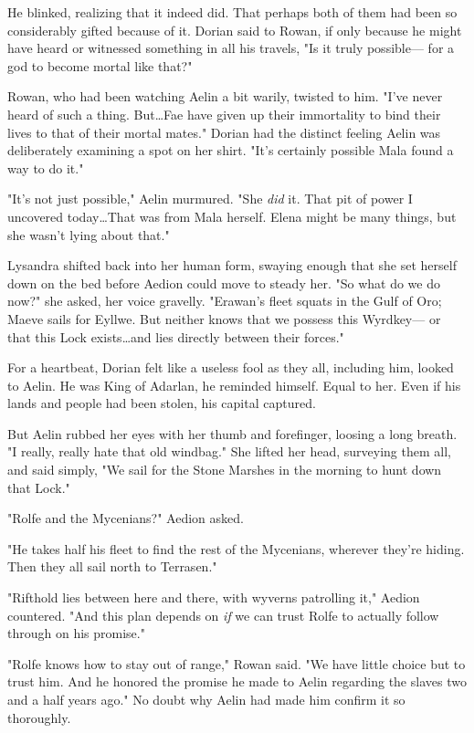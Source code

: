 He blinked, realizing that it indeed did.
That perhaps both of them had been so considerably gifted because of it.
Dorian said to Rowan, if only because he might have heard or witnessed something in all his travels, "Is it truly possible--- for a god to become mortal like that?"

Rowan, who had been watching Aelin a bit warily, twisted to him.
"I've never heard of such a thing.
But\ldots Fae have given up their immortality to bind their lives to that of their mortal mates."
Dorian had the distinct feeling Aelin was deliberately examining a spot on her shirt.
"It's certainly possible Mala found a way to do it."

"It's not just possible," Aelin murmured.
"She \emph{did} it.
That  pit of power I uncovered today\ldots That was from Mala herself.
Elena might be many things, but she wasn't lying about that."

Lysandra shifted back into her human form, swaying enough that she set herself down on the bed before Aedion could move to steady her.
"So what do we do now?"
she asked, her voice gravelly.
"Erawan's fleet squats in the Gulf of Oro; Maeve sails for Eyllwe.
But neither knows that we possess this Wyrdkey--- or that this Lock exists\ldots and lies directly between their forces."

For a heartbeat, Dorian felt like a useless fool as they all, including him, looked to Aelin.
He was King of Adarlan, he reminded himself.
Equal to her.
Even if his lands and people had been stolen, his capital captured.

But Aelin rubbed her eyes with her thumb and forefinger, loosing a long breath.
"I really, really hate that old windbag."
She lifted her head, surveying them all, and said simply, "We sail for the Stone Marshes in the morning to hunt down that Lock."

"Rolfe and the Mycenians?"
Aedion asked.

"He takes half his fleet to find the rest of the Mycenians, wherever they're hiding.
Then they all sail north to Terrasen."

"Rifthold lies between here and there, with wyverns patrolling it," Aedion countered.
"And this plan depends on \emph{if} we can trust Rolfe to actually follow through on his promise."

"Rolfe knows how to stay out of range," Rowan said.
"We have little choice but to trust him.
And he honored the promise he made to Aelin regarding the slaves two and a half years ago."
No doubt why Aelin had made him confirm it so thoroughly.


